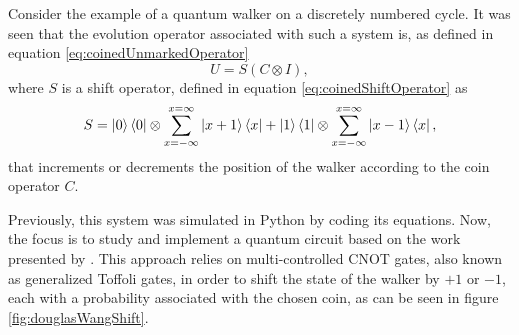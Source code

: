 \documentclass[../../dissertation.tex]{subfiles}
\begin{document}
Consider the example of a quantum walker on a discretely numbered cycle. It was
seen that the evolution operator associated with such a system is, as defined in equation \eqref{eq:coinedUnmarkedOperator}
\begin{equation}
	   U = S(C\otimes I), 
           \label{eq:coinedUnmarkedOperatorQiskit}
\end{equation}
where $S$ is a shift operator, defined in equation \eqref{eq:coinedShiftOperator}
as 
\begin{equation}
          S = \ket{0}\bra{0} \otimes \sum_{x=-\infty}^{x=\infty} \ket{x+1}\bra{x} + \ket{1}\bra{1}\otimes \sum_{x=-\infty}^{x=\infty} \ket{x-1}\bra{x},
	  \label{eq:shiftMatrixQiskit}
\end{equation} 
that increments or decrements the position of the walker according to the coin operator $C$.\par
Previously, this system was simulated in Python by coding its equations.  Now,
the focus is to study and implement a quantum circuit based on the work
presented by \cite{douglaswang07}. This approach relies on multi-controlled
CNOT gates, also known as generalized Toffoli gates, in order to shift the state of the walker by $+1$ or $-1$, each with
a probability associated with the chosen coin, as can be seen in figure
\ref{fig:douglasWangShift}. 
\end{document}
